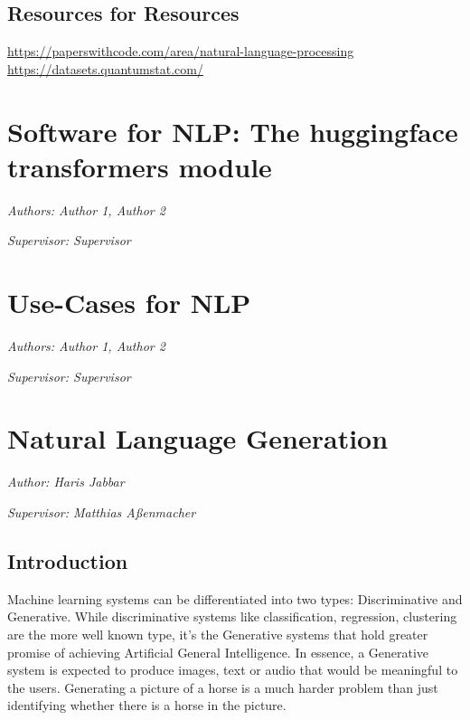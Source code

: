 \documentclass[]{krantz}
\begin{document}
\hypertarget{resources-for-resources}{%
\section{Resources for Resources}\label{resources-for-resources}}

\url{https://paperswithcode.com/area/natural-language-processing}
\url{https://datasets.quantumstat.com/}

\hypertarget{software-for-nlp-the-huggingface-transformers-module}{%
\chapter{Software for NLP: The huggingface transformers module}\label{software-for-nlp-the-huggingface-transformers-module}}

\emph{Authors: Author 1, Author 2}

\emph{Supervisor: Supervisor}

\hypertarget{use-cases-for-nlp}{%
\chapter{Use-Cases for NLP}\label{use-cases-for-nlp}}

\emph{Authors: Author 1, Author 2}

\emph{Supervisor: Supervisor}

\hypertarget{natural-language-generation}{%
\chapter{Natural Language Generation}\label{natural-language-generation}}

\emph{Author: Haris Jabbar}

\emph{Supervisor: Matthias Aßenmacher}

\hypertarget{introduction}{%
\section{Introduction}\label{introduction}}

Machine learning systems can be differentiated into two types: Discriminative and Generative. While discriminative systems like classification, regression, clustering are the more well known type, it's the Generative systems that hold greater promise of achieving Artificial General Intelligence. In essence, a Generative system is expected to produce images, text or audio that would be meaningful to the users. Generating a picture of a horse is a much harder problem than just identifying whether there is a horse in the picture.
\end{document}
